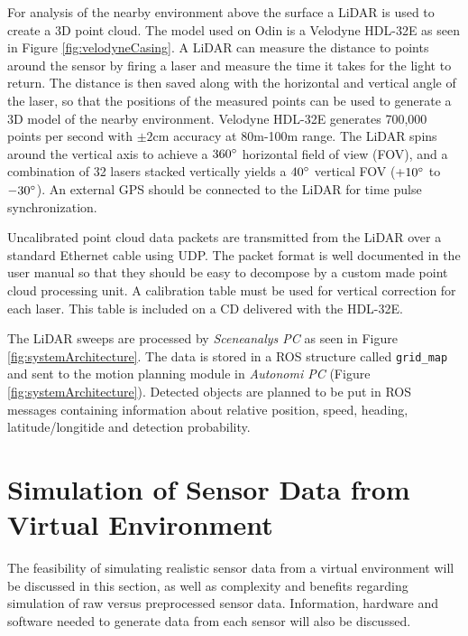 For analysis of the nearby environment above the surface a LiDAR is used to create a 3D point cloud. The model used on Odin is a Velodyne HDL-32E as seen in Figure \ref{fig:velodyneCasing}. A LiDAR can measure the distance to points around the sensor by firing a laser and measure the time it takes for the light to return. The distance is then saved along with the horizontal and vertical angle of the laser, so that the positions of the measured points can be used to generate a 3D model of the nearby environment. Velodyne HDL-32E generates 700,000 points per second with $\pm2$cm accuracy at 80m-100m range. The LiDAR spins around the vertical axis to achieve a $360\degree$ horizontal field of view (FOV), and a combination of 32 lasers stacked vertically yields a $40\degree$ vertical FOV ($+10\degree$ to $-30\degree$). An external GPS should be connected to the LiDAR for time pulse synchronization.

Uncalibrated point cloud data packets are transmitted from the LiDAR over a standard Ethernet cable using UDP. The packet format is well documented in the user manual so that they should be easy to decompose by a custom made point cloud processing unit. A calibration table must be used for vertical correction for each laser. This table is included on a CD delivered with the HDL-32E.

The LiDAR sweeps are processed by \textit{Sceneanalys PC} as seen in Figure \ref{fig:systemArchitecture}. The data is stored in a ROS structure called \texttt{grid\_map} and sent to the motion planning module in \textit{Autonomi PC} (Figure \ref{fig:systemArchitecture}). Detected objects are planned to be put in ROS messages containing information about relative position, speed, heading, latitude/longitide and detection probability.


\section{Simulation of Sensor Data from Virtual Environment}
The feasibility of simulating realistic sensor data from a virtual environment will be discussed in this section, as well as complexity and benefits regarding simulation of raw versus preprocessed sensor data. Information, hardware and software needed to generate data from each sensor will also be discussed.

